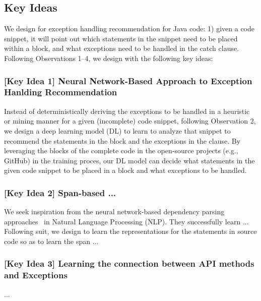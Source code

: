 \subsection{Key Ideas}
\label{key:sec}

\noindent We design {\tool} for exception handling recommendation for
Java code: 1) given a code snippet, it will point out which statements
in the snippet need to be placed within a  block, and
what exceptions need to be handled in the catch clause. Following
Observations 1--4, we design {\tool} with the following key ideas:

\subsubsection{{\bf [Key Idea 1] Neural Network-Based Approach to Exception Hanlding Recommendation}}
Instead of deterministically deriving the exceptions to be handled in
a heuristic or mining manner for a given (incomplete) code snippet, following
Observation 2, we design a deep learning model (DL) to learn to
analyze that snippet to recommend the statements in the
 block and the exceptions in the  clause.
By leveraging the  blocks of the complete code in the
open-source projects (e.g., GitHub) in the training proces, our DL
model can decide what statements in the given code snippet to be
placed in a  block and what exceptions to be handled.


\subsubsection{{\bf [Key Idea 2] Span-based ...}}
We seek inspiration from the neural network-based dependency parsing
approaches~\cite{?} in Natural Language Processing (NLP). They
successfully learn ... Following suit, we design \tool to learn the
representations for the statements in source code so as to learn the
span ...

\vspace{2pt}
\subsubsection{{\bf [Key Idea 3] Learning the connection between API methods and Exceptions}}
...

